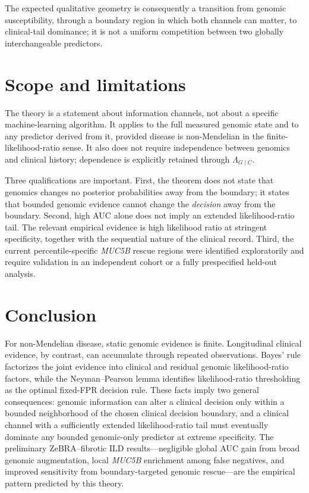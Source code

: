 \documentclass[journal]{IEEEtran}
\newcommand{\LR}{\Lambda}
\begin{document}
The expected qualitative geometry is consequently a transition from genomic susceptibility, through a boundary region in which both channels can matter, to clinical-tail dominance; it is not a uniform competition between two globally interchangeable predictors.

\section{Scope and limitations}

The theory is a statement about information channels, not about a specific machine-learning algorithm. It applies to the full measured genomic state and to any predictor derived from it, provided disease is non-Mendelian in the finite-likelihood-ratio sense. It also does not require independence between genomics and clinical history; dependence is explicitly retained through $\LR_{G\mid C}$.

Three qualifications are important. First, the theorem does not state that genomics changes no posterior probabilities away from the boundary; it states that bounded genomic evidence cannot change the \emph{decision} away from the boundary. Second, high AUC alone does not imply an extended likelihood-ratio tail. The relevant empirical evidence is high likelihood ratio at stringent specificity, together with the sequential nature of the clinical record. Third, the current percentile-specific \textit{MUC5B} rescue regions were identified exploratorily and require validation in an independent cohort or a fully prespecified held-out analysis.

\section{Conclusion}

For non-Mendelian disease, static genomic evidence is finite. Longitudinal clinical evidence, by contrast, can accumulate through repeated observations. Bayes' rule factorizes the joint evidence into clinical and residual genomic likelihood-ratio factors, while the Neyman--Pearson lemma identifies likelihood-ratio thresholding as the optimal fixed-FPR decision rule. These facts imply two general consequences: genomic information can alter a clinical decision only within a bounded neighborhood of the chosen clinical decision boundary, and a clinical channel with a sufficiently extended likelihood-ratio tail must eventually dominate any bounded genomic-only predictor at extreme specificity. The preliminary ZeBRA--fibrotic ILD results---negligible global AUC gain from broad genomic augmentation, local \textit{MUC5B} enrichment among false negatives, and improved sensitivity from boundary-targeted genomic rescue---are the empirical pattern predicted by this theory.
\end{document}
